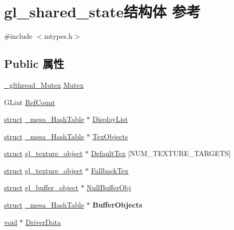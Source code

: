 \hypertarget{structgl__shared__state}{}\section{gl\+\_\+shared\+\_\+state结构体 参考}
\label{structgl__shared__state}


{\ttfamily \#include $<$mtypes.\+h$>$}

\subsection*{Public 属性}
\begin{DoxyCompactItemize}
\item 
\hyperlink{struct___c_r_i_t_i_c_a_l___s_e_c_t_i_o_n}{\+\_\+glthread\+\_\+\+Mutex} \hyperlink{structgl__shared__state_ad1848576f749312009f9b08da0a9a662}{Mutex}
\item 
G\+Lint \hyperlink{structgl__shared__state_a34b9fe91376740f6a093ba97997664a2}{Ref\+Count}
\item 
\hyperlink{interfacestruct}{struct} \hyperlink{struct__mesa___hash_table}{\+\_\+mesa\+\_\+\+Hash\+Table} $\ast$ \hyperlink{structgl__shared__state_a27d2206482abf69a1e034d52695aa3fd}{Display\+List}
\item 
\hyperlink{interfacestruct}{struct} \hyperlink{struct__mesa___hash_table}{\+\_\+mesa\+\_\+\+Hash\+Table} $\ast$ \hyperlink{structgl__shared__state_a854a7050be955d4578d63f561f8d6ab6}{Tex\+Objects}
\item 
\hyperlink{interfacestruct}{struct} \hyperlink{structgl__texture__object}{gl\+\_\+texture\+\_\+object} $\ast$ \hyperlink{structgl__shared__state_ac0afd416c85bcc8e88df36c20fac03e6}{Default\+Tex} \mbox{[}N\+U\+M\+\_\+\+T\+E\+X\+T\+U\+R\+E\+\_\+\+T\+A\+R\+G\+E\+TS\mbox{]}
\item 
\hyperlink{interfacestruct}{struct} \hyperlink{structgl__texture__object}{gl\+\_\+texture\+\_\+object} $\ast$ \hyperlink{structgl__shared__state_a26c7b5a32fa072428a75f3b9498403f1}{Fallback\+Tex}
\item 
\hyperlink{interfacestruct}{struct} \hyperlink{structgl__buffer__object}{gl\+\_\+buffer\+\_\+object} $\ast$ \hyperlink{structgl__shared__state_a7faa72a342d8230fcb3625c38b32057b}{Null\+Buffer\+Obj}
\item 
\mbox{\label{structgl__shared__state_a9611fad2a29cb8c31c56f4f87d91ebd5}} 
\hyperlink{interfacestruct}{struct} \hyperlink{struct__mesa___hash_table}{\+\_\+mesa\+\_\+\+Hash\+Table} $\ast$ {\bfseries Buffer\+Objects}
\item 
\hyperlink{interfacevoid}{void} $\ast$ \hyperlink{structgl__shared__state_ac6708d3375b660229f23fb3f297767ae}{Driver\+Data}
\end{DoxyCompactItemize}
